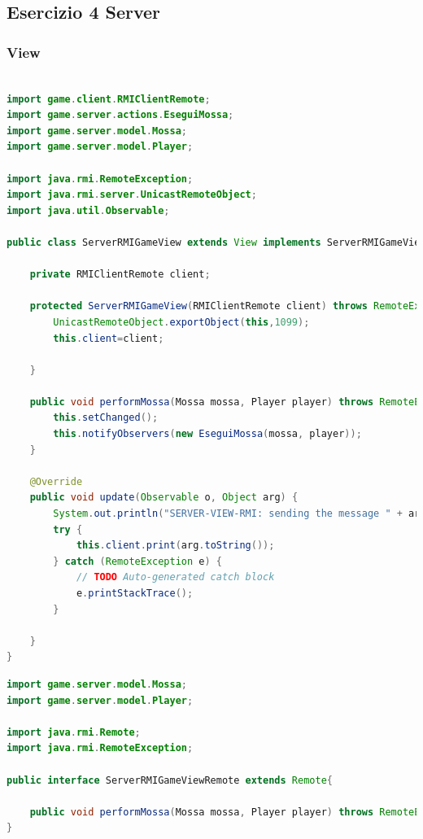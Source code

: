 \documentclass{article}
\begin{document}
\subsection{Esercizio 4 Server}
\subsubsection{View}
\begin{lstlisting}[language=Java,escapechar=|]

import game.client.RMIClientRemote;
import game.server.actions.EseguiMossa;
import game.server.model.Mossa;
import game.server.model.Player;

import java.rmi.RemoteException;
import java.rmi.server.UnicastRemoteObject;
import java.util.Observable;

public class ServerRMIGameView extends View implements ServerRMIGameViewRemote {

	private RMIClientRemote client;
	
	protected ServerRMIGameView(RMIClientRemote client) throws RemoteException {
		UnicastRemoteObject.exportObject(this,1099);
		this.client=client;
		
	}
	
	public void performMossa(Mossa mossa, Player player) throws RemoteException{
		this.setChanged();
		this.notifyObservers(new EseguiMossa(mossa, player));
	}

	@Override
	public void update(Observable o, Object arg) {
		System.out.println("SERVER-VIEW-RMI: sending the message " + arg);
		try {
			this.client.print(arg.toString());
		} catch (RemoteException e) {
			// TODO Auto-generated catch block
			e.printStackTrace();
		}
		
	}
}
\end{lstlisting}

\begin{lstlisting}[language=Java,escapechar=|]
import game.server.model.Mossa;
import game.server.model.Player;

import java.rmi.Remote;
import java.rmi.RemoteException;

public interface ServerRMIGameViewRemote extends Remote{

	public void performMossa(Mossa mossa, Player player) throws RemoteException;
}
\end{lstlisting}
\end{document}
